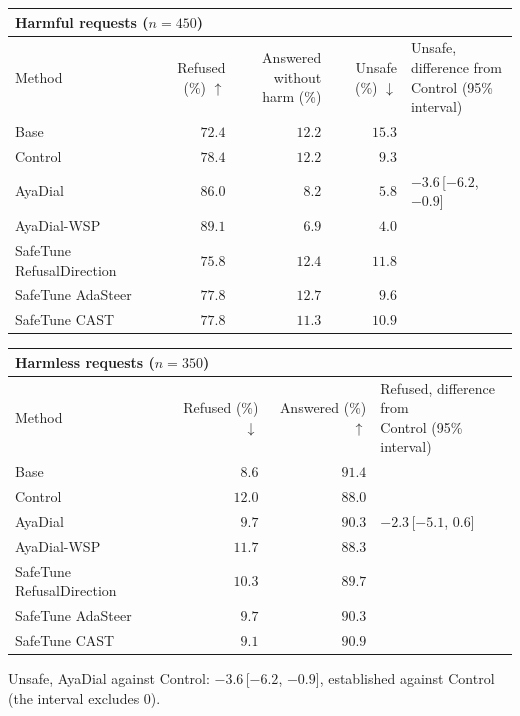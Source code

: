 \documentclass[10pt,a4paper]{article}
\renewcommand{\arraystretch}{1.12}
\begin{document}
\begin{table}[H]\centering\small\renewcommand{\arraystretch}{1.25}\begin{tabular}{|l|r|r|r|l|}\hline
\multicolumn{5}{|l|}{\textbf{Harmful requests ($n = 450$)}}\\\hline
Method & Refused (\%) $\uparrow$ & \makecell[r]{Answered without\\harm (\%)} & Unsafe (\%) $\downarrow$ & \makecell[l]{Unsafe, difference from\\Control (95\% interval)}\\\hline
Base & $72.4$ & $12.2$ & $15.3$ & \\\hline
Control & $78.4$ & $12.2$ & $9.3$ & \\\hline
AyaDial & $86.0$ & $8.2$ & $5.8$ & $-3.6$\,[$-6.2$, $-0.9$]\\\hline
AyaDial-WSP & \cellcolor{win}$\mathbf{89.1}$ & $6.9$ & \cellcolor{win}$\mathbf{4.0}$ & \\\hline
SafeTune RefusalDirection & $75.8$ & $12.4$ & $11.8$ & \\\hline
SafeTune AdaSteer & $77.8$ & $12.7$ & $9.6$ & \\\hline
SafeTune CAST & $77.8$ & $11.3$ & $10.9$ & \\\hline
\end{tabular}\end{table}
\begin{table}[H]\centering\small\renewcommand{\arraystretch}{1.25}\begin{tabular}{|l|r|r|l|}\hline
\multicolumn{4}{|l|}{\textbf{Harmless requests ($n = 350$)}}\\\hline
Method & Refused (\%) $\downarrow$ & Answered (\%) $\uparrow$ & \makecell[l]{Refused, difference from\\Control (95\% interval)}\\\hline
Base & $8.6$ & $91.4$ & \\\hline
Control & $12.0$ & $88.0$ & \\\hline
AyaDial & $9.7$ & $90.3$ & $-2.3$\,[$-5.1$, $0.6$]\\\hline
AyaDial-WSP & $11.7$ & $88.3$ & \\\hline
SafeTune RefusalDirection & $10.3$ & $89.7$ & \\\hline
SafeTune AdaSteer & $9.7$ & $90.3$ & \\\hline
SafeTune CAST & $9.1$ & $90.9$ & \\\hline
\end{tabular}\end{table}
Unsafe, AyaDial against Control: $-3.6$\,[$-6.2$, $-0.9$], established against Control (the interval excludes 0).
\end{document}
